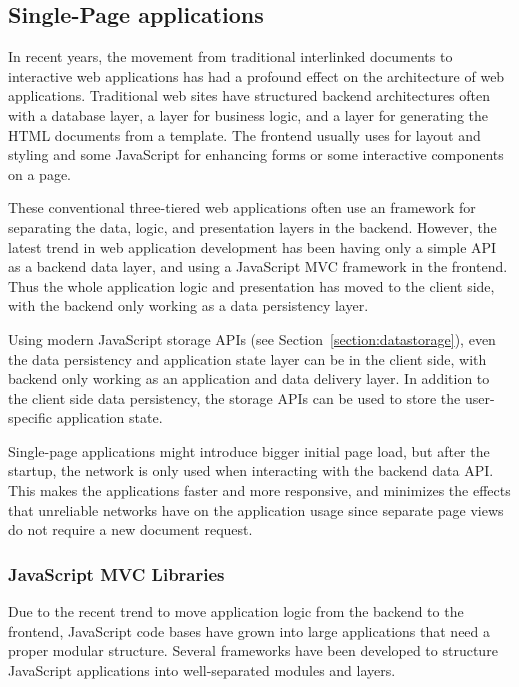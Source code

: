 \subsection{Single-Page applications}
\label{section:single-page-applications}

In recent years, the movement from traditional interlinked documents
to interactive web applications has had a profound effect on the
architecture of web applications. Traditional web sites have
structured backend architectures often with a database layer, a layer
for business logic, and a layer for generating the HTML documents from
a template. The frontend usually uses  for layout and
styling and some JavaScript for enhancing forms or some interactive
components on a page.

These conventional three-tiered web applications often use an
 \cite{gamma1995design} framework for separating the data,
logic, and presentation layers in the backend. However, the latest
trend in web application development has been having only a simple
 \citationneeded API as a backend data layer, and using a
JavaScript MVC framework in the frontend. Thus the whole application
logic and presentation has moved to the client side, with the backend
only working as a data persistency layer.

Using modern JavaScript storage APIs (see
Section~\ref{section:datastorage}), even the data persistency and
application state layer can be in the client side, with backend only
working as an application and data delivery layer. In addition to the
client side data persistency, the storage APIs can be used to store
the user-specific application state.

Single-page applications might introduce bigger initial page load, but
after the startup, the network is only used when interacting with the
backend data API. This makes the applications faster and more
responsive, and minimizes the effects that unreliable networks have on
the application usage since separate page views do not require a new
document request.

\subsubsection{JavaScript MVC Libraries}
\label{section:js-mvc}

Due to the recent trend to move application logic from the backend to
the frontend, JavaScript code bases have grown into large applications
that need a proper modular structure. Several frameworks have been
developed to structure JavaScript applications into well-separated
modules and layers.

